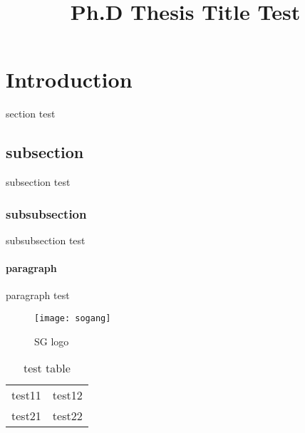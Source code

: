 \documentclass[11pt,a4paper]{article}
\title{Ph.D Thesis Title Test}
\begin{document}
\maketitle
\newpage
{}


\section{Introduction}
section test

\subsection{subsection}

subsection test

\subsubsection{subsubsection}

subsubsection test

\paragraph{paragraph}

paragraph test

\begin{figure}[htb]
\centering
\texttt{[image: sogang]}
\caption{SG logo}	%
\label{fig:sglogo}
\end{figure}


\begin{table}[htb]
\centering
\begin{tabular}{c|c}
test11 & test12 \\
test21 & test22
\end{tabular}
\caption{test table}	%
\label{tab:test}
\end{table}

\nocite{*}	%



\newpage
{}


\end{document}
